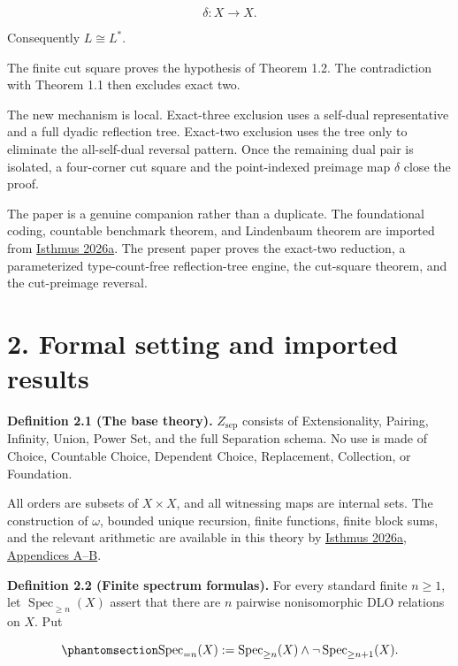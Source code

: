 \documentclass[
  english,
  11pt,
  reqno]{amsart}
\begin{document}
\[
\delta:X\longrightarrow X.
\]

Consequently \(L\cong L^*\).

The finite cut square proves the hypothesis of Theorem 1.2. The
contradiction with Theorem 1.1 then excludes exact two.

The new mechanism is local. Exact-three exclusion uses a self-dual
representative and a full dyadic reflection tree. Exact-two exclusion
uses the tree only to eliminate the all-self-dual reversal pattern. Once
the remaining dual pair is isolated, a four-corner cut square and the
point-indexed preimage map \(\delta\) close the proof.

The paper is a genuine companion rather than a duplicate. The
foundational coding, countable benchmark theorem, and Lindenbaum theorem
are imported from \hyperref[ref:isthmus2026a]{Isthmus 2026a}. The
present paper proves the exact-two reduction, a parameterized
type-count-free reflection-tree engine, the cut-square theorem, and the
cut-preimage reversal.

\protect{}\label{sec:formal-setting}

\section{2. Formal setting and imported
results}\label{formal-setting-and-imported-results}

\protect{}\label{def:2-1-base-theory}

\textbf{Definition 2.1 (The base theory).} \(Z_{\mathrm{sep}}\) consists
of Extensionality, Pairing, Infinity, Union, Power Set, and the full
Separation schema. No use is made of Choice, Countable Choice, Dependent
Choice, Replacement, Collection, or Foundation.

All orders are subsets of \(X\times X\), and all witnessing maps are
internal sets. The construction of \(\omega\), bounded unique recursion,
finite functions, finite block sums, and the relevant arithmetic are
available in this theory by \hyperref[ref:isthmus2026a]{Isthmus 2026a,
Appendices A--B}.

\protect{}\label{def:2-2-spectrum}

\textbf{Definition 2.2 (Finite spectrum formulas).} For every standard
finite \(n\ge1\), let \(\operatorname{Spec}_{\ge n}(X)\) assert that
there are \(n\) pairwise nonisomorphic DLO relations on \(X\). Put

\begin{equation}\protect\phantomsection\label{eq:finite-spectrum-formula}{
\operatorname{Spec}_{=n}(X)
:=
\operatorname{Spec}_{\ge n}(X)
\wedge
\neg\operatorname{Spec}_{\ge n+1}(X).
}\end{equation}
\end{document}
